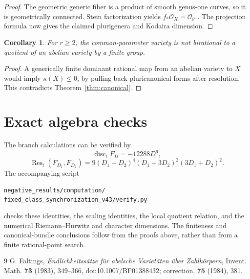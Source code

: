 \documentclass[11pt,a4paper]{article}
\newtheorem{corollary}[theorem]{Corollary}
\newcommand{\Pp}{\mathbb P}
\begin{document}
\begin{proof}
The geometric generic fiber is a product of smooth genus-one curves,
so it is geometrically connected. Stein factorization yields
$f_*\mathcal O_X=\mathcal O_{\Pp^1}$. The projection formula now gives
the claimed plurigenera and Kodaira dimension.
\end{proof}

\begin{corollary}
For $r\geq2$, the common-parameter variety is not birational to a
quotient of an abelian variety by a finite group.
\end{corollary}
\begin{proof}
A generically finite dominant rational map from an abelian variety to
$X$ would imply $\kappa(X)\leq0$, by pulling back pluricanonical forms
after resolution. This contradicts Theorem~\ref{thm:canonical}.
\end{proof}


\section{Exact algebra checks}

The branch calculations can be verified by
\[
 \operatorname{disc}_t F_D=-12288D^6,
\]
\[
 \operatorname{Res}_t(F_{D_1},F_{D_2})
 =9(D_1-D_2)^4(D_1+3D_2)^2(3D_1+D_2)^2.
\]
The accompanying script
\begin{center}\small
\nolinkurl{negative_results/computation/}\\
\nolinkurl{fixed_class_synchronization_v43/verify.py}
\end{center}
checks these identities, the scaling identities, the local quotient
relation, and the numerical Riemann--Hurwitz and character dimensions.
The finiteness and canonical-bundle conclusions follow from the proofs
above, rather than from a finite rational-point search.

\begin{thebibliography}{9}
G. Faltings, \emph{Endlichkeitss\"atze f\"ur abelsche Variet\"aten
\"uber Zahlk\"orpern}, Invent. Math. \textbf{73} (1983), 349--366,
doi:10.1007/BF01388432; correction, \textbf{75} (1984), 381.
\end{thebibliography}
\end{document}

